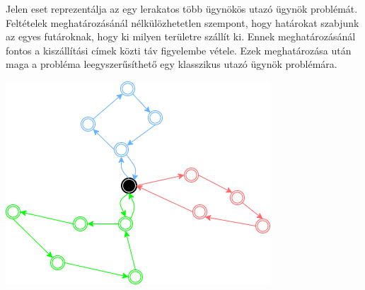 

Jelen eset reprezentálja az egy lerakatos több ügynökös utazó ügynök problémát. Feltételek meghatározásánál nélkülözhetetlen szempont, hogy határokat szabjunk az egyes futároknak, hogy ki milyen területre szállít ki. Ennek meghatározásánál fontos a kiszállítási címek közti táv figyelembe vétele. Ezek meghatározása után maga a probléma leegyszerűsíthető egy klasszikus utazó ügynök problémára.

\includegraphics[scale=0.7]{images/Onedepotmtsp.png}



